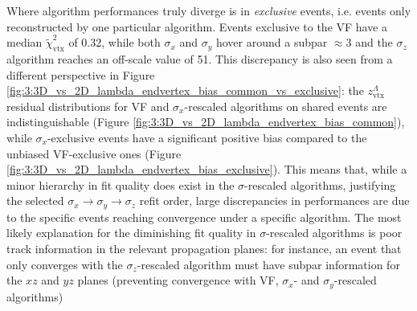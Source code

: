 Where algorithm performances truly diverge is in \textit{exclusive} events, i.e. events only reconstructed by one particular algorithm.
Events exclusive to the VF have a median $\tilde{\chi}^2_\text{vtx}$ of 0.32, while both $\sigma_x$ and $\sigma_y$ hover around a subpar $\approx 3$ and the $\sigma_z$ algorithm reaches an off-scale value of 51.
This discrepancy is also seen from a different perspective in Figure \ref{fig:3:3D_vs_2D_lambda_endvertex_bias_common_vs_exclusive}: the $z_\text{vtx}^\Lambda$ residual distributions for VF and $\sigma_x$-rescaled algorithms on shared events are indistinguishable (Figure \ref{fig:3:3D_vs_2D_lambda_endvertex_bias_common}), while $\sigma_x$-exclusive events have a significant positive bias compared to the unbiased VF-exclusive ones (Figure \ref{fig:3:3D_vs_2D_lambda_endvertex_bias_exclusive}).
This means that, while a minor hierarchy in fit quality does exist in the $\sigma$-rescaled algorithms, justifying the selected $\sigma_x \rightarrow \sigma_y \rightarrow \sigma_z$ refit order, large discrepancies in performances are due to the specific events reaching convergence under a specific algorithm.
The most likely explanation for the diminishing fit quality in $\sigma$-rescaled algorithms is poor track information in the relevant propagation planes:
for instance, an event that only converges with the $\sigma_z$-rescaled algorithm must have subpar information for the $xz$ and $yz$ planes (preventing convergence with VF, $\sigma_x$- and $\sigma_y$-rescaled algorithms) %

